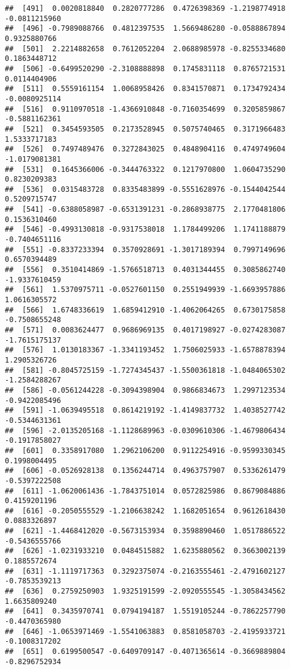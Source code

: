 \documentclass[
  12pt,
]{article}
\begin{document}
\begin{verbatim}
##  [491]  0.0020818840  0.2820777286  0.4726398369 -1.2198774918 -0.0811215960
##  [496] -0.7989088766  0.4812397535  1.5669486280 -0.0588867894  0.9325880766
##  [501]  2.2214882658  0.7612052204  2.0688985978 -0.8255334680  0.1863448712
##  [506] -0.6499520290 -2.3108888898  0.1745831118  0.8765721531  0.0114404906
##  [511]  0.5559161154  1.0068958426  0.8341570871  0.1734792434 -0.0080925114
##  [516]  0.9110970518 -1.4366910848 -0.7160354699  0.3205859867 -0.5881162361
##  [521]  0.3454593505  0.2173528945  0.5075740465  0.3171966483  1.5333717183
##  [526]  0.7497489476  0.3272843025  0.4848904116  0.4749749604 -1.0179081381
##  [531]  0.1645366006 -0.3444763322  0.1217970800  1.0604735290  0.8230209383
##  [536]  0.0315483728  0.8335483899 -0.5551628976 -0.1544042544  0.5209715747
##  [541] -0.6388058987 -0.6531391231 -0.2868938775  2.1770481806  0.1536310460
##  [546] -0.4993130818 -0.9317538018  1.1784499206  1.1741188879 -0.7404651116
##  [551] -0.8337233394  0.3570928691 -1.3017189394  0.7997149696  0.6570394489
##  [556]  0.3510414869 -1.5766518713  0.4031344455  0.3085862740 -1.9337610459
##  [561]  1.5370975711 -0.0527601150  0.2551949939 -1.6693957886  1.0616305572
##  [566]  1.6748336619  1.6859412910 -1.4062064265  0.6730175858 -0.7508655248
##  [571]  0.0083624477  0.9686969135  0.4017198927 -0.0274283087 -1.7615175137
##  [576]  1.0130183367 -1.3341193452  1.7506025933 -1.6578878394  1.2905326726
##  [581] -0.8045725159 -1.7274345437 -1.5500361818 -1.0484065302 -1.2584288267
##  [586] -0.0561244228 -0.3094398904  0.9866834673  1.2997123534 -0.9422085496
##  [591] -1.0639495518  0.8614219192 -1.4149837732  1.4038527742 -0.5344631361
##  [596] -2.0135205168 -1.1128689963 -0.0309610306 -1.4679806434 -0.1917858027
##  [601]  0.3358917080  1.2962106200  0.9112254916 -0.9599330345  0.1998004495
##  [606] -0.0526928138  0.1356244714  0.4963757907  0.5336261479 -0.5397222508
##  [611] -1.0620061436 -1.7843751014  0.0572825986  0.8679084886  0.4159201196
##  [616] -0.2050555529 -1.2106638242  1.1682051654  0.9612618430  0.0883326897
##  [621] -1.4468412020 -0.5673153934  0.3598890460  1.0517886522 -0.5436555766
##  [626] -1.0231933210  0.0484515882  1.6235880562  0.3663002139  0.1885572674
##  [631] -1.1119717363  0.3292375074 -0.2163555461 -2.4791602127 -0.7853539213
##  [636]  0.2759250903  1.9325191599 -2.0920555545 -1.3058434562  1.6635809240
##  [641]  0.3435970741  0.0794194187  1.5519105244 -0.7862257790 -0.4470365980
##  [646] -1.0653971469 -1.5541063883  0.8581058703 -2.4195933721 -0.1008317202
##  [651]  0.6199500547 -0.6409709147 -0.4071365614 -0.3669889804 -0.8296752934

\end{verbatim}
\end{document}
